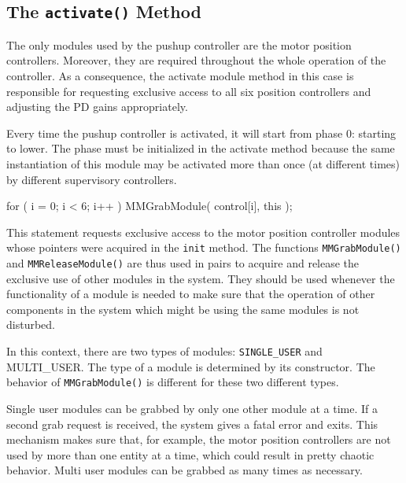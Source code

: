 \subsection{The {\tt activate()} Method}

The only modules used by the pushup controller are the motor position
controllers. Moreover, they are required throughout the whole operation of
the controller. As a consequence, the activate module method in this case is
responsible for requesting exclusive access to all six position controllers
and adjusting the PD gains appropriately.

\begin{codesegment}
void PushupController::activate( void ) {
  int          i;
  MotorGains_t gains;

  phase = 0;
\end{codesegment}

Every time the pushup controller is activated, it will start from phase 0:
starting to lower. The phase must be initialized in the activate method
because the same instantiation of this module may be activated more than
once (at different times) by different supervisory controllers.

\begin{codesegment}
  for ( i = 0; i < 6; i++ )
    MMGrabModule( control[i], this );
\end{codesegment}

This statement requests exclusive access to the motor position controller
modules whose pointers were acquired in the {\tt init} method. The functions
{\tt MMGrabModule()} and {\tt MMReleaseModule()} are thus used in pairs to
acquire and release the exclusive use of other modules in the system. They
should be used whenever the functionality of a module is needed to make sure
that the operation of other components in the system which might be using
the same modules is not disturbed.

In this context, there are two types of modules: {\tt SINGLE\_USER} and
{MULTI\_USER}. The type of a module is determined by its constructor. The
behavior of {\tt MMGrabModule()} is different for these two different types.

Single user modules can be grabbed by only one other module at a time. If a
second grab request is received, the system gives a fatal error and
exits. This mechanism makes sure that, for example, the motor position
controllers are not used by more than one entity at a time, which could
result in pretty chaotic behavior. Multi user modules can be grabbed as many
times as necessary.

